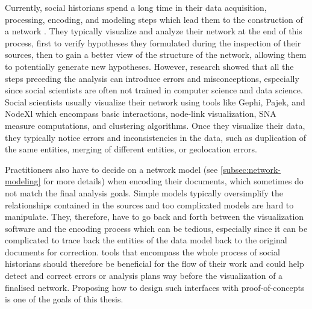 Currently, social historians spend a long time in their data acquisition, processing, encoding, and modeling steps which lead them to the construction of a network \cite{dufournaudCommentRendreVisible2018, lemercierBackSourcesPracticing2021}.
They typically visualize and analyze their network at the end of this process, first to verify hypotheses they formulated during the inspection of their sources, then to gain a better view of the structure of the network, allowing them to potentially generate new hypotheses\cite{lemercier12FormalNetwork2015}.
However, research showed that all the steps preceding the analysis can introduce errors and misconceptions, especially since social scientists are often not trained in computer science and data science\cite{lemercierQuantitativeMethodsHumanities2019, alkadi2022}.
Social scientists usually visualize their network using \sna tools like Gephi, Pajek, and NodeXl which encompass basic interactions, node-link visualization, SNA measure computations, and clustering algorithms.
Once they visualize their data, they typically notice errors and inconsistencies in the data, such as duplication of the same entities, merging of different entities, or geolocation errors\cite{diesnerImpactEntityDisambiguation2015, alkadi2022}.

Practitioners also have to decide on a network model\cite{cristofoliAuxSourcesGrands2008} (see \autoref{subsec:network-modeling} for more details) when encoding their documents, which sometimes do not match the final analysis goals.
Simple models typically oversimplify the relationships contained in the sources\cite{lemercier12FormalNetwork2015} and too complicated models are hard to manipulate\cite{opitzInductionLargeScaleKnowledge2018}.
They, therefore, have to go back and forth between the visualization software and the encoding process which can be tedious, especially since it can be complicated to trace back the entities of the data model back to the original documents for correction.
\va tools that encompass the whole process of social historians should therefore be beneficial for the flow of their work and could help detect and correct errors or analysis plans way before the visualization of a finalised network.
Proposing how to design such interfaces with proof-of-concepts is one of the goals of this thesis.

